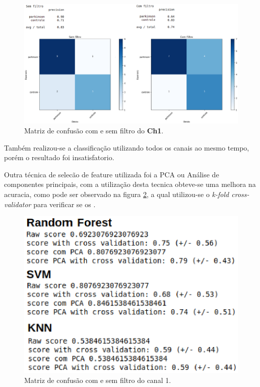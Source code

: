 \begin{figure}[!htb]
	\centering
	\includegraphics[width=1.1\textwidth]{figuras/filtroComp.eps}
	\caption{Matriz de confusão com e sem filtro do \textbf{Ch1}.}
	\label{comesemfiltro}
\end{figure}

Também realizou-se a classificação utilizando todos os canais ao mesmo tempo, porém o resultado foi insatisfatorio.

Outra técnica de selecão de feature utilizada foi a PCA ou Análise de componentes principais, com a utilização desta tecnica obteve-se uma melhora na acuracia, como pode ser observado na figura \ref{pcavalidator}, a qual utilizou-se o \textit{k-fold cross-validator} para verificar se os .

\begin{figure}[!htb]
	\centering
	\includegraphics[width=1.1\textwidth]{figuras/modeloComp.eps}
	\caption{Matriz de confusão com e sem filtro do canal 1.}
	\label{pcavalidator}
\end{figure}

